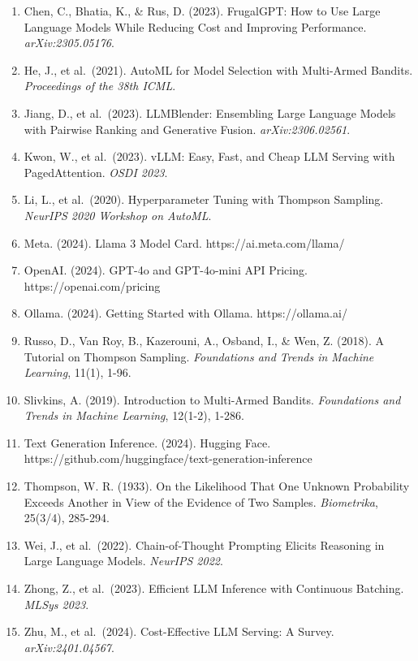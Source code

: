 \documentclass[
]{article}
\begin{document}
\begin{enumerate}
\def\labelenumi{\arabic{enumi}.}
\item
  Chen, C., Bhatia, K., \& Rus, D. (2023). FrugalGPT: How to Use Large
  Language Models While Reducing Cost and Improving Performance.
  \emph{arXiv:2305.05176}.
\item
  He, J., et al.~(2021). AutoML for Model Selection with Multi-Armed
  Bandits. \emph{Proceedings of the 38th ICML}.
\item
  Jiang, D., et al.~(2023). LLMBlender: Ensembling Large Language Models
  with Pairwise Ranking and Generative Fusion. \emph{arXiv:2306.02561}.
\item
  Kwon, W., et al.~(2023). vLLM: Easy, Fast, and Cheap LLM Serving with
  PagedAttention. \emph{OSDI 2023}.
\item
  Li, L., et al.~(2020). Hyperparameter Tuning with Thompson Sampling.
  \emph{NeurIPS 2020 Workshop on AutoML}.
\item
  Meta. (2024). Llama 3 Model Card. https://ai.meta.com/llama/
\item
  OpenAI. (2024). GPT-4o and GPT-4o-mini API Pricing.
  https://openai.com/pricing
\item
  Ollama. (2024). Getting Started with Ollama. https://ollama.ai/
\item
  Russo, D., Van Roy, B., Kazerouni, A., Osband, I., \& Wen, Z. (2018).
  A Tutorial on Thompson Sampling. \emph{Foundations and Trends in
  Machine Learning}, 11(1), 1-96.
\item
  Slivkins, A. (2019). Introduction to Multi-Armed Bandits.
  \emph{Foundations and Trends in Machine Learning}, 12(1-2), 1-286.
\item
  Text Generation Inference. (2024). Hugging Face.
  https://github.com/huggingface/text-generation-inference
\item
  Thompson, W. R. (1933). On the Likelihood That One Unknown Probability
  Exceeds Another in View of the Evidence of Two Samples.
  \emph{Biometrika}, 25(3/4), 285-294.
\item
  Wei, J., et al.~(2022). Chain-of-Thought Prompting Elicits Reasoning
  in Large Language Models. \emph{NeurIPS 2022}.
\item
  Zhong, Z., et al.~(2023). Efficient LLM Inference with Continuous
  Batching. \emph{MLSys 2023}.
\item
  Zhu, M., et al.~(2024). Cost-Effective LLM Serving: A Survey.
  \emph{arXiv:2401.04567}.
\end{enumerate}
\end{document}
